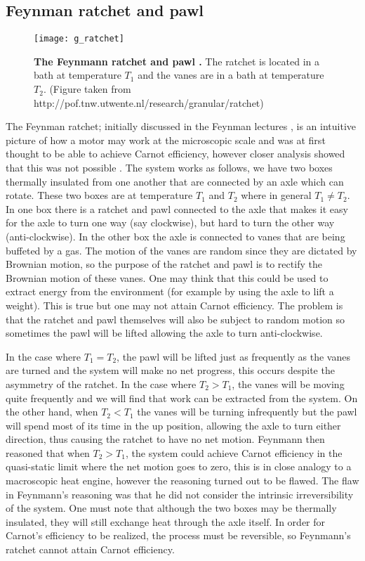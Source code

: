 \subsection{Feynman ratchet and pawl}
\begin{figure}
	\center
	\texttt{[image: g\_ratchet]}
	\caption{\textbf{The Feynmann ratchet and pawl \cite{Feynman1963}.} The ratchet is located in a bath at temperature $T_1$ and the vanes are in a bath at temperature $T_2$.  (Figure taken from http://pof.tnw.utwente.nl/research/granular/ratchet) \label{fig:feynmannRatchet}}
\end{figure}
The Feynman ratchet; initially discussed in the Feynman lectures \cite{Feynman1963}, is an intuitive picture of how a motor may work at the microscopic scale and was at first thought to be able to achieve Carnot efficiency, however closer analysis showed that this was not possible \cite{ParrondoEspanol1996}. The system works as follows, we have two boxes thermally insulated from one another that are connected by an axle which can rotate. These two boxes are at temperature $T_1$ and $T_2$ where in general $T_1 \neq T_2$. In one box there is a ratchet and pawl connected to the axle that makes it easy for the axle to turn one way (say clockwise), but hard to turn the other way (anti-clockwise). In the other box the axle is connected to vanes that are being buffeted by a gas. The motion of the vanes are random since they are dictated by Brownian motion, so the purpose of the ratchet and pawl is to rectify the Brownian motion of these vanes. One may think that this could be used to extract energy from the environment (for example by using the axle to lift a weight). This is true but one may not attain Carnot efficiency. The problem is that the ratchet and pawl themselves will also be subject to random motion so sometimes the pawl will be lifted allowing the axle to turn anti-clockwise.

In the case where $T_1 = T_2$, the pawl will be lifted just as frequently as the vanes are turned and the system will make no net progress, this occurs despite the asymmetry of the ratchet. In the case where $T_2 > T_1$, the vanes will be moving quite frequently and we will find that work can be extracted from the system. On the other hand, when $T_2 < T_1$ the vanes will be turning infrequently but the pawl will spend most of its time in the up position, allowing the axle to turn either direction, thus causing the ratchet to have no net motion. Feynmann then reasoned that when $T_2 > T_1$, the system could achieve Carnot efficiency in the quasi-static limit where the net motion goes to zero, this is in close analogy to a macroscopic heat engine, however the reasoning turned out to be flawed. The flaw in Feynmann's reasoning  was that he did not consider the intrinsic irreversibility of the system. One must note that although the two boxes may be thermally insulated, they will still exchange heat through the axle itself. In order for Carnot's efficiency to be realized, the process must be reversible, so Feynmann's ratchet cannot attain Carnot efficiency.  


